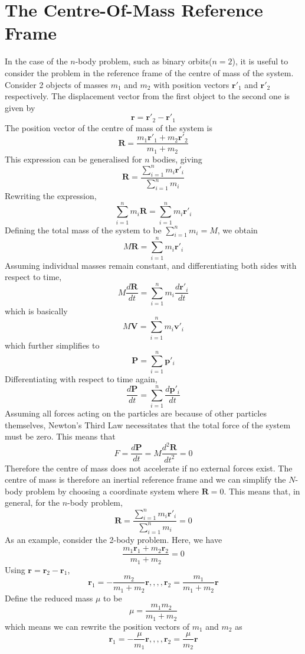 \documentclass{article}
\begin{document}
\section{The Centre-Of-Mass Reference Frame}
In the case of the $n$-body problem, such as binary orbits($n=2$), it is useful to consider the problem in the reference frame of the centre of mass of the system. Consider 2 objects of masses $m_1$ and $m_2$ with position vectors $\textbf{r}'_1$ and $\textbf{r}'_2$ respectively. The displacement vector from the first object to the second one is given by 
$$\textbf{r}=\textbf{r}'_2-\textbf{r}'_1$$
The position vector of the centre of mass of the system is 
$$\textbf{R}=\frac{m_1\textbf{r}'_1+m_2\textbf{r}'_2}{m_1+m_2}$$
This expression can be generalised for $n$ bodies, giving
$$\textbf{R}=\frac{\sum_{i=1}^nm_i\textbf{r}'_i}{\sum_{i=1}^nm_i}$$
Rewriting the expression, 
$$\sum_{i=1}^nm_i\textbf{R}=\sum_{i=1}^nm_i\textbf{r}'_i$$
Defining the total mass of the system to be $\sum_{i=1}^nm_i=M$, we obtain
$$M\textbf{R}=\sum_{i=1}^nm_i\textbf{r}'_i$$
Assuming individual masses remain constant, and differentiating both sides with respect to time, 
$$M\frac{d\textbf{R}}{dt}=\sum_{i=1}^nm_i\frac{d\textbf{r}'_i}{dt}$$
which is basically
$$M\textbf{V}=\sum_{i=1}^nm_i\textbf{v}'_i$$
which further simplifies to 
$$\textbf{P}=\sum_{i=1}^n\textbf{p}'_i$$
Differentiating with respect to time again, 
$$\frac{d\textbf{P}}{dt}=\sum_{i=1}^n\frac{d\textbf{p}'_i}{dt}$$
Assuming all forces acting on the particles are because of other particles themselves, Newton's Third Law necessitates that the total force of the system must be zero. This means that
$$F=\frac{d\textbf{P}}{dt}=M\frac{d^2\textbf{R}}{dt^2}=0$$
Therefore the centre of mass does not accelerate if no external forces exist. The centre of mass is therefore an inertial reference frame and we can simplify the $N$-body problem by choosing a coordinate system where $\textbf{R}=0$. This means that, in general, for the $n$-body problem, 
$$\textbf{R}=\frac{\sum_{i=1}^nm_i\textbf{r}'_i}{\sum_{i=1}^nm_i}=0$$
As an example, consider the 2-body problem. Here, we have
$$\frac{m_1\textbf{r}_1+m_2\textbf{r}_2}{m_1+m_2}=0$$
Using $\textbf{r}=\textbf{r}_2-\textbf{r}_1$, 
$$\textbf{r}_1=-\frac{m_2}{m_1+m_2}\textbf{r},,,,\textbf{r}_2=\frac{m_1}{m_1+m_2}\textbf{r}$$
Define the reduced mass $\mu$ to be 
$$\mu=\frac{m_1m_2}{m_1+m_2}$$
which means we can rewrite the position vectors of $m_1$ and $m_2$ as 
$$\textbf{r}_1=-\frac{\mu}{m_1}\textbf{r},,,,\textbf{r}_2=\frac{\mu}{m_2}\textbf{r}$$
\\
\\
\end{document}
